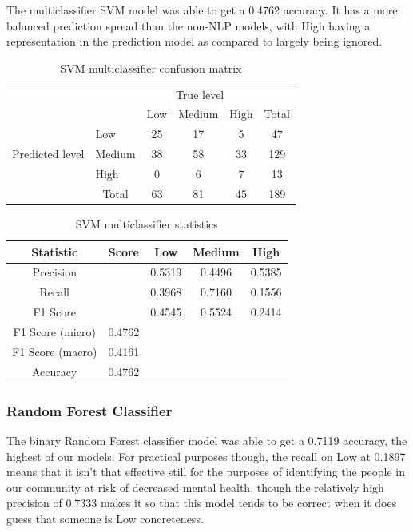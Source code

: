 \documentclass[12pt, a4paper]{article}
\begin{document}
The multiclassifier SVM model was able to get a 0.4762 accuracy. It has a more balanced prediction spread than the non-NLP models, with High having a representation in the prediction model as compared to largely being ignored.

\begin{table}[ht]
\centering
\begin{tabular}{l|l|c|c|c|c}
\multicolumn{2}{c}{}&\multicolumn{3}{c}{True level}&\\
\cline{3-5}
\multicolumn{2}{c|}{}&Low&Medium&High&\multicolumn{1}{c}{Total}\\
\cline{2-5}
\multirow{3}{*}{Predicted level}& Low & 25 & 17 & 5 & 47\\
\cline{2-5}
& Medium & 38 & 58 & 33 & 129\\
\cline{2-5}
& High & 0 & 6 & 7 & 13\\
\cline{2-5}
\multicolumn{1}{c}{} & \multicolumn{1}{c}{Total} & \multicolumn{1}{c}{63} & \multicolumn{    1}{c}{81} & \multicolumn{    1}{c}{45} & \multicolumn{1}{c}{189}\\
\end{tabular}

\caption{SVM multiclassifier confusion matrix}
\label{table:svmcm}
\end{table}

\begin{table}[ht]
\centering
\begin{tabular}{||c c c c c||} 
 \hline
 Statistic & Score & Low & Medium & High  \\ [0.5ex] 
 \hline\hline
 Precision &  & 0.5319 & 0.4496 & 0.5385 \\ 
 Recall & & 0.3968 & 0.7160  & 0.1556 \\
 F1 Score &  & 0.4545 & 0.5524  & 0.2414\\
 F1 Score (micro) & 0.4762 & & & \\
 F1 Score (macro)  & 0.4161 & & & \\ 
 Accuracy  & 0.4762 & & & \\ [1ex] 
 \hline
\end{tabular}

\caption{SVM multiclassifier statistics}
\label{table:svmstat}
\end{table}

\subsubsection{Random Forest Classifier}

The binary Random Forest classifier model was able to get a 0.7119 accuracy, the highest of our models. For practical purposes though, the recall on Low at 0.1897 means that it isn't that effective still for the purposes of identifying the people in our community at risk of decreased mental health, though the relatively high precision of 0.7333 makes it so that this model tends to be correct when it does guess that someone is Low concreteness.
\end{document}
